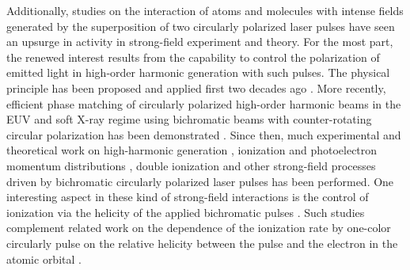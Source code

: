 Additionally, studies on the interaction of atoms and molecules with intense fields generated by the superposition of two circularly polarized laser pulses have seen an upsurge in activity in strong-field experiment and theory. For the most part, the renewed interest results from the capability to control the polarization of emitted light in high-order harmonic generation with such pulses. The physical principle has been proposed and applied first two decades ago 
\cite{eichmann1995,long1995}. 
More recently, efficient phase matching of circularly polarized high-order harmonic beams in the EUV and soft X-ray regime using bichromatic beams with counter-rotating circular polarization has been demonstrated \cite{fleischer2014,pisanty2014,kfir2015,fan2015,hickstein2015}. Since then, much experimental and theoretical work on high-harmonic generation \cite{milosevic2015a,medisauskas2015,milosevic2015b,chen2016,baykusheva2016,hernandez2016,liu2016,mauger2016,bandrauk2016,reich2016b,odzak2016,dorney2017,fleischer2017,zhavoronkov2017,pisanty2017,baykusheva2017,lerner2017,ayuso2018,dixit2018,barreau2018,huang2018,jimenez2018,heslar2018,paufler2018,li2019}, 
ionization and photoelectron momentum distributions
\cite{ngoko2015,yuan2016,milosevic2016c,mancuso2016,milosevic2016b,mancuso2017,pengel2017,busuladzic2017,hoang2017,lin2017,abusamha2018,busuladzic2018,eckart2018,li2018,han2018,eckart2018b,liu2018,eicke2019,ge2019,kerbstadt2019,abusamha2019}, double ionization 
\cite{mancuso2016b,eckart2016,ben2017,ngoko2017,yu2018,huang2018b,ma2019}
and other strong-field processes \cite{yuan2015,buica2018,guo2019} driven by bichromatic circularly polarized laser pulses has been performed. One interesting aspect in these kind of strong-field interactions is the control of ionization via the helicity of the applied bichromatic pulses \cite{milosevic2016c,mancuso2016,liu2018}. Such studies complement related work on the dependence of the ionization rate by one-color circularly pulse on the relative helicity between the pulse and the electron in the atomic orbital
\cite{barth2011,kazansky2012,herath2012,barth2013,bauer2014,barth2014,ooi2014,hartung2016,douguet2016,watzel2016,wang2017,zhang2017,eckart2018c,liu2018b,trabert2018}.

